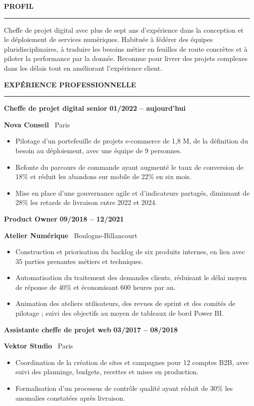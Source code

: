 \documentclass[10pt,a4paper]{article}
\newcommand{\mainsection}[1]{%
  \vspace{5.5pt}%
  {\large\bfseries\color{navy}\MakeUppercase{#1}}\par
  \vspace{1.5pt}%
  {\color{blue}\rule{\linewidth}{1.15pt}}\par
  \vspace{4pt}%
}
\newcommand{\experience}[4]{%
  \textbf{\color{ink}#1}\hfill
  {\footnotesize\bfseries\color{muted}#2}\par
  {\small\bfseries\color{blue}#3}%
  \hfill{\footnotesize\color{muted}\faMapMarker*\ #4}\par
}
\begin{document}
\hfill
\begin{minipage}[t]{0.66\textwidth}
  \vspace{0pt}
  \RaggedRight

  \mainsection{Profil}
  Cheffe de projet digital avec plus de sept ans d'expérience dans la conception
  et le déploiement de services numériques. Habituée à fédérer des équipes
  pluridisciplinaires, à traduire les besoins métier en feuilles de route
  concrètes et à piloter la performance par la donnée. Reconnue pour livrer des
  projets complexes dans les délais tout en améliorant l'expérience client.

  \mainsection{Expérience professionnelle}

  \experience{Cheffe de projet digital senior}{01/2022 -- aujourd'hui}
    {Nova Conseil}{Paris}
  \begin{itemize}
    \item Pilotage d'un portefeuille de projets e-commerce de 1,8 M\texteuro{},
      de la définition du besoin au déploiement, avec une équipe de 9 personnes.
    \item Refonte du parcours de commande ayant augmenté le taux de conversion de
      18\% et réduit les abandons sur mobile de 22\% en six mois.
    \item Mise en place d'une gouvernance agile et d'indicateurs partagés,
      diminuant de 28\% les retards de livraison entre 2022 et 2024.
  \end{itemize}

  \vspace{4pt}
  \experience{Product Owner}{09/2018 -- 12/2021}
    {Atelier Numérique}{Boulogne-Billancourt}
  \begin{itemize}
    \item Construction et priorisation du backlog de six produits internes,
      en lien avec 35 parties prenantes métiers et techniques.
    \item Automatisation du traitement des demandes clients, réduisant le délai
      moyen de réponse de 40\% et économisant 600 heures par an.
    \item Animation des ateliers utilisateurs, des revues de sprint et des comités
      de pilotage ; suivi des objectifs au moyen de tableaux de bord Power BI.
  \end{itemize}

  \vspace{4pt}
  \experience{Assistante cheffe de projet web}{03/2017 -- 08/2018}
    {Vektor Studio}{Paris}
  \begin{itemize}
    \item Coordination de la création de sites et campagnes pour 12 comptes B2B,
      avec suivi des plannings, budgets, recettes et mises en production.
    \item Formalisation d'un processus de contrôle qualité ayant réduit de 30\%
      les anomalies constatées après livraison.
  \end{itemize}


\end{minipage}
\end{document}

